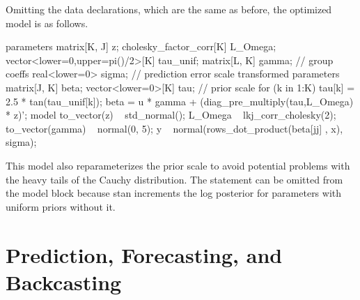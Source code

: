 Omitting the data declarations, which are the same as before, the
optimized model is as follows.
%
\begin{stancode}
parameters {
  matrix[K, J] z;
  cholesky_factor_corr[K] L_Omega;
  vector<lower=0,upper=pi()/2>[K] tau_unif;
  matrix[L, K] gamma;                         // group coeffs
  real<lower=0> sigma;                       // prediction error scale
}
transformed parameters {
  matrix[J, K] beta;
  vector<lower=0>[K] tau;     // prior scale
  for (k in 1:K) tau[k] = 2.5 * tan(tau_unif[k]);
  beta = u * gamma + (diag_pre_multiply(tau,L_Omega) * z)';
}
model {
  to_vector(z) ~ std_normal();
  L_Omega ~ lkj_corr_cholesky(2);
  to_vector(gamma) ~ normal(0, 5);
  y ~ normal(rows_dot_product(beta[jj] , x), sigma);
}
\end{stancode}

This model also reparameterizes the prior scale  to avoid potential problems with the heavy tails of the Cauchy distribution. The statement  can be omitted from the model block because stan increments the log posterior for parameters with uniform priors without it.




\section{Prediction, Forecasting, and Backcasting}

